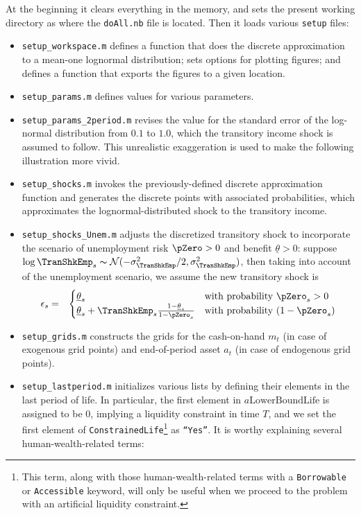 \documentclass[titlepage,abstract]{\econtex}
\providecommand{\thetaMin}{\underline{\theta}}
\begin{document}
At the beginning it clears everything in the memory, and sets the present working directory as where the \texttt{doAll.nb} file is located. Then it loads various \texttt{setup} files:
\begin{itemize}
      \item \texttt{setup\_workspace.m} defines a function that does the discrete approximation to a mean-one lognormal distribution; sets options for plotting figures; and defines a function that exports the figures to a given location.
      \item \texttt{setup\_params.m} defines values for various parameters.
      \item \texttt{setup\_params\_2period.m} revises the value for the standard error of the log-normal distribution from $0.1$ to $1.0$, which the transitory income shock is assumed to follow. This unrealistic exaggeration is used to make the following illustration more vivid.
      \item \texttt{setup\_shocks.m} invokes the previously-defined discrete approximation function and generates the discrete points with associated probabilities, which approximates the lognormal-distributed shock to the transitory income.
      \item \texttt{setup\_shocks\_Unem.m} adjusts the discretized transitory shock to incorporate the scenario of unemployment risk $\pZero>0$ and benefit $\thetaMin>0$: suppose $\log \TranShkEmp_{s}\thicksim \mathcal{N}(-\sigma_{\TranShkEmp}^{2}/2, \sigma_{\TranShkEmp}^{2})$, then taking into account of the unemployment scenario, we assume the new transitory shock is
          \begin{eqnarray}
          \epsilon_{s} &=& 
          \begin{cases}
            \thetaMin_{s} & \text{with probability $\pZero_{s}>0$} \\
            \thetaMin_{s} + \TranShkEmp_{s}\frac{1-\thetaMin_{s}}{1-\pZero_{s}}  & \text{with probability $(1-\pZero_{s})$}
          \end{cases}
          \end{eqnarray}
      \item \texttt{setup\_grids.m} constructs the grids for the cash-on-hand $m_{t}$ (in case of exogenous grid points) and end-of-period asset $a_{t}$ (in case of endogenous grid points).
      \item \texttt{setup\_lastperiod.m} initializes various lists by defining their elements in the last period of life. In particular, the first element in $a\text{LowerBoundLife}$ is assigned to be 0, implying a liquidity constraint in time $T$, and we set the first element of \texttt{ConstrainedLife}\footnote{This term, along with those human-wealth-related terms with a \texttt{Borrowable} or \texttt{Accessible} keyword, will only be useful when we proceed to the problem with an artificial liquidity constraint.} as \texttt{``Yes''}. It is worthy explaining several human-wealth-related terms:

\end{itemize}
\end{document}
